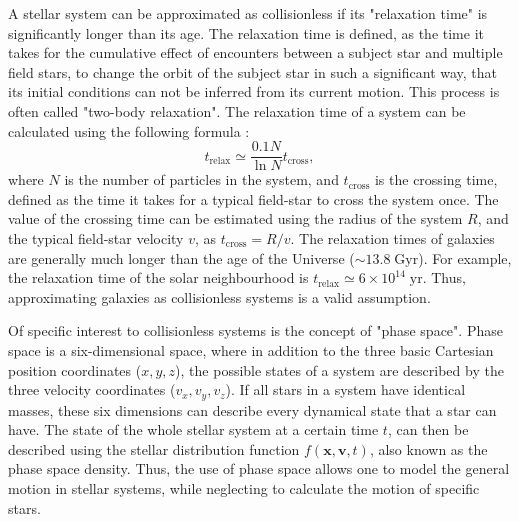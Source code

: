 \documentclass[english, twoside]{HYgradu}
\begin{document}
A stellar system can be approximated as collisionless if its "relaxation time" is significantly longer than its age. The relaxation time is defined, as the time it takes for the cumulative effect of encounters between a subject star and multiple field stars, to change the orbit of the subject star in such a significant way, that its initial conditions can not be inferred from its current motion. This process is often called "two-body relaxation". The relaxation time of a system can be calculated using the following formula \citep{BinneyTremaine}:
\begin{equation}
t_\mathrm{relax} \simeq \frac{0.1N}{\ln N} t_\mathrm{cross},
\end{equation}
where $N$ is the number of particles in the system, and $t_\mathrm{cross}$ is the crossing time, defined as the time it takes for a typical field-star to cross the system once.  The value of the crossing time can be estimated using the radius of the system $R$, and the typical field-star velocity $v$, as $t_\mathrm{cross} = R/v$. The relaxation times of galaxies are generally much longer than the age of the Universe ($\sim 13.8 \; \mathrm{Gyr}$). For example, the relaxation time of the solar neighbourhood is $t_\mathrm{relax} \simeq 6 \times 10^{14} \; \mathrm{yr}$. Thus, approximating galaxies as collisionless systems is a valid assumption.

Of specific interest to collisionless systems is the concept of "phase space". Phase space is a six-dimensional space, where in addition to the three basic Cartesian position coordinates ($x, y, z$), the possible states of a system are described by the three velocity coordinates ($v_x, v_y, v_z$). If all stars in a system have identical masses, these six dimensions can describe every dynamical state that a star can have. The state of the whole stellar system at a certain time $t$, can then be described using the stellar distribution function $f(\mathbf{x}, \mathbf{v}, t)$, also known as the phase space density. Thus, the use of phase space allows one to model the general motion in stellar systems, while neglecting to calculate the motion of specific stars.
\end{document}
